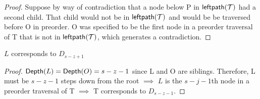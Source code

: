 \begin{proof}
    Suppose by way of contradiction that a node below P in $\mathsf{leftpath}{(\mathcal{\mathcal{T}})}$ had a second child. That child would not be in $\mathsf{leftpath}{(\mathcal{\mathcal{T}})}$ and would be be traversed before O in preorder. O was specified to be the first node in a preorder traversal of T that is not in $\mathsf{leftpath}{(\mathcal{\mathcal{T}})}$, which generates a contradiction.

\end{proof}

\begin{remark} \label{re:L_sz1}
    $L$ corresponds to $D_{s-z+1}$ %
\end{remark}
\begin{proof}

    $\mathsf{Depth}{(L)}=\mathsf{Depth}{(O)}=s-z-1$ since L and O are siblings. Therefore, L must be $s-z-1$ steps down from the root $\implies$ $L$ is the $s-j-1$th node in a preorder traversal of T $\implies$ T corresponds to $D_{s-z-1}$.


\end{proof}












